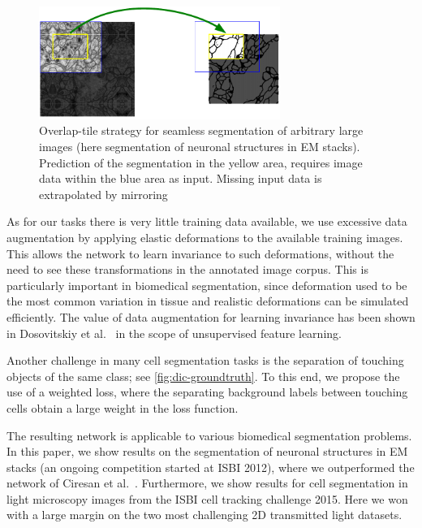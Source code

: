 \documentclass{llncs}
\begin{document}
\begin{figure}[t]
  \centering
  \includegraphics[width=0.7\textwidth]{overlap-tile}
  \caption{Overlap-tile strategy for seamless segmentation of arbitrary large images (here segmentation of neuronal structures in EM stacks). Prediction of the segmentation in the yellow area, requires image data within the blue area as input. Missing input data is extrapolated by mirroring}
  \label{fig:overlap-tile}
\end{figure}

As for our tasks there is very little training data available, we use excessive data augmentation by applying elastic deformations to the available training images. This allows the network to learn invariance to such deformations, without the need to see these transformations in the annotated image corpus. This is particularly important in biomedical segmentation, since deformation used to be the most common variation in tissue and realistic deformations can be simulated efficiently. The value of data augmentation for learning invariance has been shown in Dosovitskiy et al.~\cite{unsupervised} in the scope of unsupervised feature learning.

Another challenge in many cell segmentation tasks is the separation of touching objects of the same class; see \autoref{fig:dic-groundtruth}. To this end, we propose the use of a weighted loss, where the separating background labels between touching cells obtain a large weight in the loss function.

The resulting network is applicable to various biomedical segmentation problems. In this paper, we show results on the segmentation of neuronal structures in EM stacks (an ongoing competition started at ISBI 2012), where we outperformed the network of Ciresan et al.~\cite{schmidhuber12deepneural}. Furthermore, we show results for cell segmentation in light microscopy images from the ISBI cell tracking challenge 2015. Here we won with a large margin on the two most challenging 2D transmitted light datasets.
\end{document}
